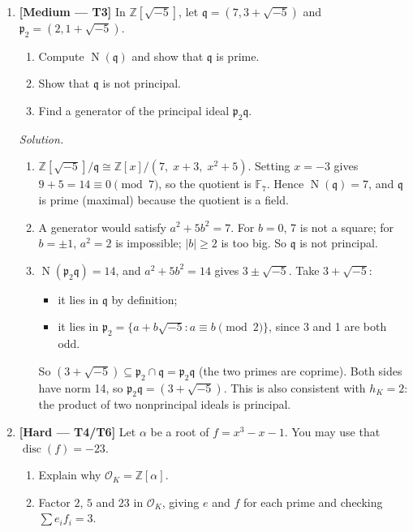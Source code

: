 \documentclass[11pt]{article}
\newcommand{\Z}{\mathbb{Z}}
\newcommand{\F}{\mathbb{F}}
\newcommand{\OK}{\mathcal{O}_K}
\newcommand{\fp}{\mathfrak{p}}
\newcommand{\fq}{\mathfrak{q}}
\DeclareMathOperator{\Nm}{N}
\DeclareMathOperator{\disc}{disc}
\begin{document}
\begin{enumerate}[label=\textbf{B\arabic*.}]
  \item \textbf{[Medium --- T3]} In $\Z[\sqrt{-5}]$, let $\fq=(7,3+\sqrt{-5})$ and $\fp_2=(2,1+\sqrt{-5})$.
  \begin{enumerate}[label=(\alph*)]
    \item Compute $\Nm(\fq)$ and show that $\fq$ is prime.
    \item Show that $\fq$ is not principal.
    \item Find a generator of the principal ideal $\fp_2\fq$.
  \end{enumerate}

  \textit{Solution.}
  \begin{enumerate}[label=(\alph*)]
    \item $\Z[\sqrt{-5}]/\fq\cong\Z[x]/(7,\;x+3,\;x^2+5)$. Setting $x=-3$ gives $9+5=14\equiv0\pmod 7$, so the quotient is $\F_7$. Hence $\Nm(\fq)=7$, and $\fq$ is prime (maximal) because the quotient is a field.
    \item A generator would satisfy $a^2+5b^2=7$. For $b=0$, 7 is not a square; for $b=\pm1$, $a^2=2$ is impossible; $|b|\ge2$ is too big. So $\fq$ is not principal.
    \item $\Nm(\fp_2\fq)=14$, and $a^2+5b^2=14$ gives $3\pm\sqrt{-5}$. Take $3+\sqrt{-5}$:
    \begin{itemize}
      \item it lies in $\fq$ by definition;
      \item it lies in $\fp_2=\{a+b\sqrt{-5}: a\equiv b\pmod2\}$, since 3 and 1 are both odd.
    \end{itemize}
    So $(3+\sqrt{-5})\subseteq\fp_2\cap\fq=\fp_2\fq$ (the two primes are coprime). Both sides have norm 14, so $\fp_2\fq=(3+\sqrt{-5})$. This is also consistent with $h_K=2$: the product of two nonprincipal ideals is principal.
  \end{enumerate}

  \item \textbf{[Hard --- T4/T6]} Let $\alpha$ be a root of $f=x^3-x-1$. You may use that $\disc(f)=-23$.
  \begin{enumerate}[label=(\alph*)]
    \item Explain why $\OK=\Z[\alpha]$.
    \item Factor $2$, $5$ and $23$ in $\OK$, giving $e$ and $f$ for each prime and checking $\sum e_if_i=3$.
  \end{enumerate}


\end{enumerate}
\end{document}
